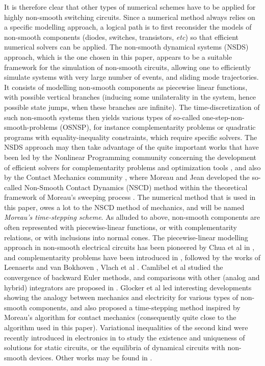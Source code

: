 \documentclass{article}
\begin{document}
It is therefore clear that other types of numerical schemes have to be applied for highly non-smooth switching circuits. Since a numerical method always relies on a specific modelling approach, a logical path is to first reconsider the models of non-smooth components (diodes, switches, transistors, {\em etc}) so that efficient numerical solvers can be applied. The non-smooth dynamical systems (NSDS) approach, which is the one chosen in this paper, appears to be a suitable framework for the simulation of non-smooth circuits, allowing one to efficiently simulate systems with very large number of events, and sliding mode trajectories. It consists of modelling non-smooth components as piecewise linear functions, with possible vertical branches (inducing some unilaterality in the system, hence possible state jumps, when these branches are infinite). The time-discretization of such non-smooth systems then yields various types of so-called one-step-non-smooth-problems (OSNSP), for instance complementarity problems or quadratic programs with equality-inequality constraints, which require specific solvers. The NSDS approach may then take advantage of the quite important works that have been led by the Nonlinear Programming community concerning the development of efficient solvers for complementarity problems \cite{facchinei} and optimization tools \cite{hiriart1992}, and also by the Contact Mechanics community \cite{acary-brogliato2008}, where Moreau and Jean developed the so-called Non-Smooth Contact Dynamics (NSCD) method within the theoretical framework of Moreau's sweeping process \cite{moreau1988,jean1999,moreau1999}. The numerical method that is used in this paper, owes a lot to the NSCD method of mechanics, and will be named {\em Moreau's time-stepping scheme}. As alluded to above, non-smooth components are often represented with piecewise-linear functions, or with complementarity relations, or with inclusions into normal cones. The piecewise-linear modelling approach in non-smooth electrical circuits has been pioneered by Chua et al  in \cite{chua1978,chua1983,chua1985}, and complementarity problems have been introduced in \cite{bokhoven1978,stevens1981,vandenberghe1989}, followed by the works of Leenaerts and van Bokhoven \cite{leenaerts1999,leenaerts-bokhoven1998}, Vlach et al \cite{vlach1997,vlach1995a,vlach1995b}. Camlibel et al \cite{frasca2008,camlibel2002} studied the convergence of backward Euler methods, and comparisons with other (analog and hybrid) integrators are proposed in \cite{vasca2009}. Glocker et al \cite{glocker2005,moller2007} led interesting developments showing the analogy between mechanics and electricity for various types of non-smooth components, and also proposed a time-stepping method inspired by Moreau's algorithm for contact mechanics (consequently quite close to the algorithm used in this paper). Variational inequalities of the second kind were recently introduced in electronics in \cite{adly2007,goelevenJOTA,addi2009} to study the existence and uniqueness of solutions for static circuits, or the equilibria of dynamical circuits with non-smooth devices. Other works may be found in \cite{enge2005,batlle2005,giaouris2008}.
\end{document}
